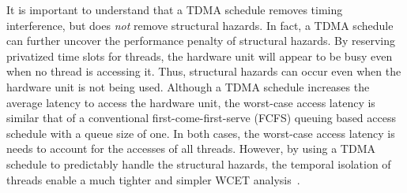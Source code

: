It is important to understand that a TDMA schedule removes timing interference, but does \emph{not} remove structural hazards.
In fact, a TDMA schedule can further uncover the performance penalty of structural hazards.
By reserving privatized time slots for threads, the hardware unit will appear to be busy even when no thread is accessing it.
Thus, structural hazards can occur even when the hardware unit is not being used.
Although a TDMA schedule increases the average latency to access the hardware unit, the worst-case access latency is similar that of a conventional first-come-first-serve (FCFS) queuing based access schedule with a queue size of one.
In both cases, the worst-case access latency is needs to account for the accesses of all threads.      
However, by using a TDMA schedule to predictably handle the structural hazards, the temporal isolation of threads enable a much tighter and simpler WCET analysis~.


